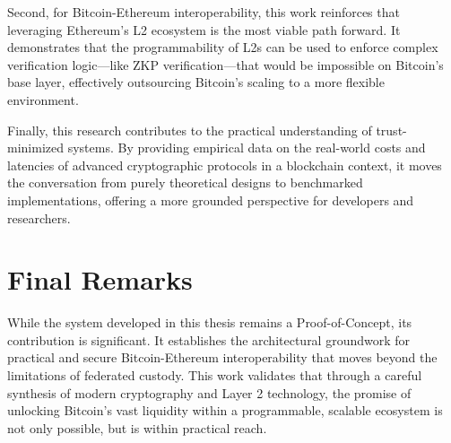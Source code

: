 \documentclass{DESSThesis}
\begin{document}
Second, for Bitcoin-Ethereum interoperability, this work reinforces that leveraging Ethereum's L2 ecosystem is the most viable path forward. It demonstrates that the programmability of L2s can be used to enforce complex verification logic—like ZKP verification—that would be impossible on Bitcoin's base layer, effectively outsourcing Bitcoin's scaling to a more flexible environment.

Finally, this research contributes to the practical understanding of trust-minimized systems. By providing empirical data on the real-world costs and latencies of advanced cryptographic protocols in a blockchain context, it moves the conversation from purely theoretical designs to benchmarked implementations, offering a more grounded perspective for developers and researchers.

\section{Final Remarks}

While the system developed in this thesis remains a Proof-of-Concept, its contribution is significant. It establishes the architectural groundwork for practical and secure Bitcoin-Ethereum interoperability that moves beyond the limitations of federated custody. This work validates that through a careful synthesis of modern cryptography and Layer 2 technology, the promise of unlocking Bitcoin's vast liquidity within a programmable, scalable ecosystem is not only possible, but is within practical reach.



\printbibliography
\end{document}
